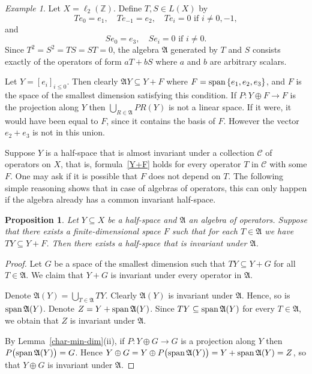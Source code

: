 \documentclass[12pt]{amsart}
\theoremstyle{plain}
\newtheorem{proposition}[theorem]{Proposition}
\theoremstyle{definition}
\theoremstyle{remark}
\newtheorem*{example}{Example}
\begin{document}
\begin{example}
Let $X=\ell_2(\mathbb Z)$. Define $T,S\in L(X)$ by 
$$
Te_{0}=e_1,\quad Te_{-1}=e_2,\quad Te_i=0\mbox{ if }i\ne 0,-1,
$$
and
$$
Se_0=e_3,\quad Se_i=0\mbox{ if }i\ne 0.
$$
Since $T^2=S^2=TS=ST=0$, the algebra $\mathfrak A$ generated by $T$ and $S$ consists exactly of the operators of form $aT+bS$ where $a$ and $b$ are arbitrary scalars.

Let $Y=[e_i]_{i{\leqslant} 0}$. Then clearly $\mathfrak AY\subseteq Y+F$ where $F={{\rm span}\,}\{e_1,e_2,e_3\}$, and $F$ is the space of the smallest dimension satisfying this condition. If $P:Y\oplus F\to F$ is the projection along $Y$ then $\bigcup_{R\in\mathfrak A}PR(Y)$ is not a linear space. If it were, it would have been equal to $F$, since it contains the basis of $F$. However the vector $e_2+e_3$ is not in this union.
\end{example}

Suppose $Y$ is a half-space that is almost invariant under a collection $\mathcal C$ of operators on $X$, that is, formula~\eqref{Y+F} holds for every operator $T$ in $\mathcal C$ with some $F$. One may ask if it is possible that $F$ does not depend on $T$. The following simple reasoning shows that in case of algebras of operators, this can only happen if the algebra already has a common invariant half-space.

\begin{proposition}\label{same-F}
 Let $Y\subseteq X$ be a half-space and $\mathfrak A$ an algebra of 
 operators. Suppose that there exists a finite-dimensional space $F$ such that 
 for each $T\in\mathfrak A$ we have $TY\subseteq Y+F$. Then there exists a
 half-space that is invariant under $\mathfrak A$.
\end{proposition}
\begin{proof}
Let $G$ be a space of the smallest dimension such that $TY\subseteq Y+G$ for all $T\in\mathfrak A$. We claim that $Y+G$ is invariant under every operator in $\mathfrak A$.

Denote $\mathfrak A(Y)=\bigcup_{T\in\mathfrak A}TY$. Clearly $\mathfrak A(Y)$ is invariant under $\mathfrak A$. Hence, so is ${{\rm span}\,}\mathfrak A(Y)$. Denote $Z=Y+{{\rm span}\,}\mathfrak A(Y)$. Since $TY\subseteq{{\rm span}\,}\mathfrak A(Y)$ for every $T\in\mathfrak A$, we obtain that $Z$ is invariant under $\mathfrak A$.

By Lemma~\ref{char-min-dim}(ii), if $P:Y\oplus G\to G$ is a projection along $Y$ then $P\big({{\rm span}\,}\mathfrak A(Y)\big)=G$. Hence $Y\oplus G=Y\oplus P\big({{\rm span}\,}\mathfrak A(Y)\big)=Y+{{\rm span}\,}\mathfrak A(Y)=Z$, so that $Y\oplus G$ is invariant under $\mathfrak A$.
\end{proof}
\end{document}
